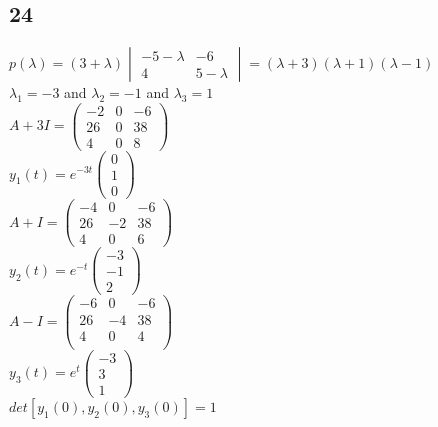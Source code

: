 \documentclass[12pt, a4paper]{IEEEtran}
\begin{document}
\begin{flushleft}
    \subsection{24}
    $p(\lambda)=(3+\lambda)\begin{vmatrix}
        -5-\lambda&-6\\
        4&5-\lambda
    \end{vmatrix}=(\lambda+3)(\lambda+1)(\lambda-1)$\\
    $\lambda_1=-3$ and $\lambda_2=-1$ and $\lambda_3=1$\\
    $A+3I=\begin{pmatrix}
        -2&0&-6\\
        26&0&38\\
        4&0&8
    \end{pmatrix}$\\
    $y_1(t)=e^{-3t}\begin{pmatrix}
        0\\
        1\\
        0
    \end{pmatrix}$\\
    $A+I=\begin{pmatrix}
        -4&0&-6\\
        26&-2&38\\
        4&0&6
    \end{pmatrix}$\\
    $y_2(t)=e^{-t}\begin{pmatrix}
        -3\\
        -1\\
        2
    \end{pmatrix}$\\
    $A-I=\begin{pmatrix}
        -6&0&-6\\
        26&-4&38\\
        4&0&4\\
    \end{pmatrix}$\\
    $y_3(t)=e^t\begin{pmatrix}
        -3\\
        3\\
        1
    \end{pmatrix}$\\
    $det[y_1(0), y_2(0), y_3(0)]=1$




    \end{flushleft}
    
\end{document}
